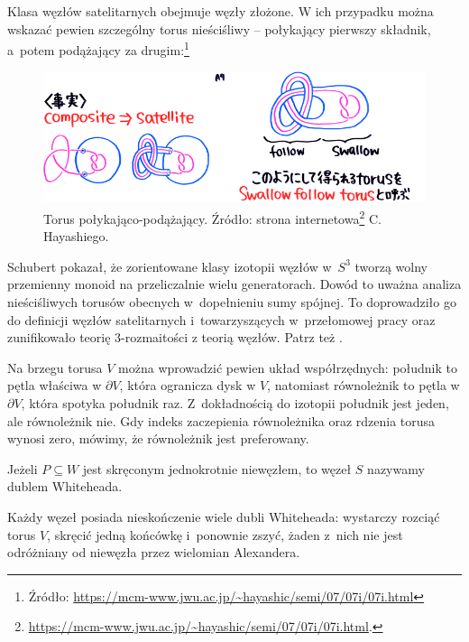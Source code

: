 \begin{example}
    Klasa węzłów satelitarnych obejmuje węzły złożone.
    W ich przypadku można wskazać pewien szczególny torus nieściśliwy -- połykający pierwszy składnik, a~potem podążający za drugim:\footnote{Źródło: \url{https://mcm-www.jwu.ac.jp/~hayashic/semi/07/07i/07i.html}}
    \begin{figure}[H]
        \centering
        \includegraphics[width=0.75\linewidth]{../data/mixed/follow-swallow.png}
        \caption[something]{Torus połykająco-podążający. Źródło: strona internetowa\footnote{\url{https://mcm-www.jwu.ac.jp/~hayashic/semi/07/07i/07i.html}.} C. Hayashiego.}
    \end{figure}
\end{example}

Schubert pokazał, że zorientowane klasy izotopii węzłów w~$S^3$ tworzą wolny przemienny monoid na przeliczalnie wielu generatorach.
Dowód to uważna analiza nieściśliwych torusów obecnych w~dopełnieniu sumy spójnej.
To doprowadziło go do definicji węzłów satelitarnych i~towarzyszących w~przełomowej pracy \cite{schubert53} oraz zunifikowało teorię 3-rozmaitości z teorią węzłów.
Patrz też \cite{motegi97}.

Na brzegu torusa $V$ można wprowadzić pewien układ współrzędnych: południk to pętla właściwa w $\partial V$, która ogranicza dysk w $V$, natomiast równoleżnik to pętla w $\partial V$, która spotyka południk raz.
Z~dokładnością do izotopii południk jest jeden, ale równoleżnik nie.
Gdy indeks zaczepienia równoleżnika oraz rdzenia torusa wynosi zero, mówimy, że równoleżnik jest preferowany.

\begin{definition}
    Jeżeli $P \subseteq W$ jest skręconym jednokrotnie niewęzłem, to węzeł $S$ nazywamy dublem Whiteheada.
\end{definition}

Każdy węzeł posiada nieskończenie wiele dubli Whiteheada: wystarczy rozciąć torus $V$, skręcić jedną końcówkę i~ponownie zszyć, żaden z~nich nie jest odróżniany od niewęzła przez wielomian Alexandera.

